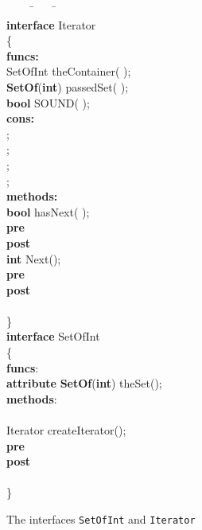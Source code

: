 \documentclass[fleqn]{llncs}
\begin{document}
\begin{figure}
\begin{center}
\begin{boxedminipage}{1\textwidth}
\scriptsize
\begin{tabbing}
\ \ \ \ \=\ \ \ \ \=\ \ \ \ \ \ \ \ \=\\
\textbf{interface} Iterator\\
\{\\
\textbf{funcs:}\\
    \>SetOfInt  theContainer( );\\
    \>\textbf{SetOf}(\textbf{int})  passedSet( );\\
    \>\textbf{bool}  SOUND( );\\
\textbf{cons:}\\
    \>;\\
    \>;\\
    \>;\\
    \>;\\
\textbf{methods:}\\
    \>\textbf{bool}    hasNext( );\\
    \>  \>\textbf{pre} \>\\
    \>  \>\textbf{post}\>\\
\>\textbf{int}    Next();\\
    \>  \>\textbf{pre}  \>\\
    \>  \>\textbf{post}\>\\
    \>  \>  \>\ \ \\
\}\\
\textbf{interface} SetOfInt\\
\{\\
\textbf{funcs}:\\
    \>\textbf{attribute} \textbf{SetOf}(\textbf{int}) theSet();\\
\textbf{methods}:\\
    \> \>\\
    \>Iterator createIterator();\\
    \>  \>\textbf{pre} \>\\
    \>  \>\textbf{post}\>\\
    \>  \>  \>\\
\}
\end{tabbing}
\end{boxedminipage}
\end{center}
\caption{The interfaces \texttt{SetOfInt} and \texttt{Iterator}}\label{FIG-ITERATOR-SPEC}
\end{figure}
\end{document}
